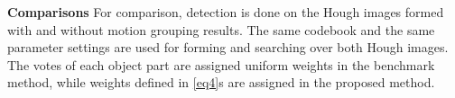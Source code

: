 \textbf{Comparisons} For comparison, detection is done on the Hough images formed with and without motion grouping results. The same codebook and the same parameter settings are used for forming and searching over both Hough images. The votes of each object part are assigned uniform weights in the benchmark method, while weights defined in \ref{eq4}s are assigned in the proposed method.
\begin{figure}
\centering
{}
\end{figure}
